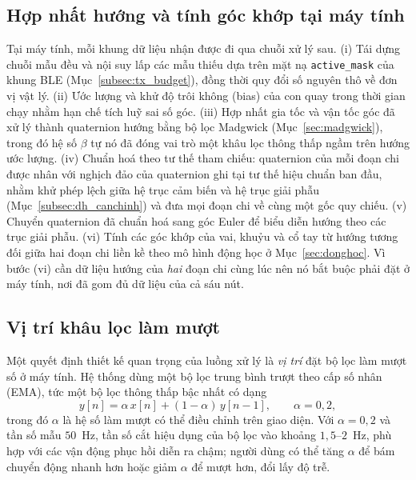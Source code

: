 \documentclass[../DoAn.tex]{subfiles}
\begin{document}
\subsection{Hợp nhất hướng và tính góc khớp tại máy tính}
\label{subsec:xl_server}
Tại máy tính, mỗi khung dữ liệu nhận được đi qua chuỗi xử lý sau. (i) Tái dựng
chuỗi mẫu đều và nội suy lấp các mẫu thiếu dựa trên mặt nạ \texttt{active\_mask}
của khung BLE (Mục~\ref{subsec:tx_budget}), đồng thời quy đổi số nguyên thô về đơn
vị vật lý. (ii) Ước lượng và khử độ trôi không (bias) của con quay trong thời gian
chạy nhằm hạn chế tích luỹ sai số góc. (iii) Hợp nhất gia tốc và vận tốc góc đã
xử lý thành quaternion hướng bằng bộ lọc Madgwick (Mục~\ref{sec:madgwick}), trong
đó hệ số $\beta$ tự nó đã đóng vai trò một khâu lọc thông thấp ngầm trên hướng ước
lượng. (iv) Chuẩn hoá theo tư thế tham chiếu: quaternion của mỗi đoạn chi được
nhân với nghịch đảo của quaternion ghi tại tư thế hiệu chuẩn ban đầu, nhằm khử
phép lệch giữa hệ trục cảm biến và hệ trục giải phẫu (Mục~\ref{subsec:dh_canchinh})
và đưa mọi đoạn chi về cùng một gốc quy chiếu. (v) Chuyển quaternion đã chuẩn hoá
sang góc Euler để biểu diễn hướng theo các trục giải phẫu. (vi) Tính các góc khớp
của vai, khuỷu và cổ tay từ hướng tương đối giữa hai đoạn chi liền kề theo mô hình
động học ở Mục~\ref{sec:donghoc}. Vì bước (vi) cần dữ liệu hướng của \textit{hai}
đoạn chi cùng lúc nên nó bắt buộc phải đặt ở máy tính, nơi đã gom đủ dữ liệu của cả
sáu nút.

\subsection{Vị trí khâu lọc làm mượt}
\label{subsec:xl_locmuot}
Một quyết định thiết kế quan trọng của luồng xử lý là \textit{vị trí} đặt bộ lọc
làm mượt số ở máy tính. Hệ thống dùng một bộ lọc trung bình trượt theo cấp số nhân
(EMA), tức một bộ lọc thông thấp bậc nhất có dạng
\begin{equation}
    \label{eq:ema}
    y[n] = \alpha\, x[n] + (1-\alpha)\, y[n-1], \qquad \alpha = 0{,}2,
\end{equation}
trong đó $\alpha$ là hệ số làm mượt có thể điều chỉnh trên giao diện. Với
$\alpha = 0{,}2$ và tần số mẫu $50$~Hz, tần số cắt hiệu dụng của bộ lọc vào khoảng
$1{,}5$--$2$~Hz, phù hợp với các vận động phục hồi diễn ra chậm; người dùng có thể
tăng $\alpha$ để bám chuyển động nhanh hơn hoặc giảm $\alpha$ để mượt hơn, đổi lấy
độ trễ.
\end{document}
